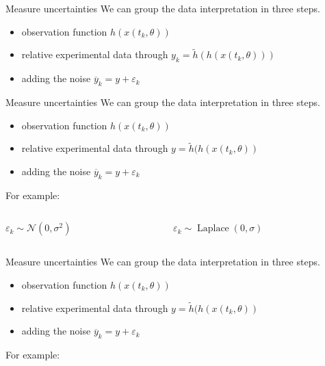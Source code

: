 \documentclass{beamer}
\newcommand{\s}{\sigma^2}
\begin{document}
  	\begin{frame}{Measure uncertainties}
    	We can group the data interpretation in three steps.
    	\begin{itemize}
    		\item observation function $h(x(t_k,\theta))$
    		\item relative experimental data through $y_k = \tilde{h}
    		(h(x(t_k,\theta)))$
    		\item adding the noise $\overline{y}_{k} = y + \varepsilon_{k}$
    	\end{itemize}
  	\end{frame}
  	
  	\begin{frame}{Measure uncertainties}
    	We can group the data interpretation in three steps.
    	\begin{itemize}
    		\item observation function $h(x(t_k,\theta))$
    		\item relative experimental data through $y = \tilde{h}
    		(h(x(t_k,\theta))$
    		\item adding the noise $\overline{y}_{k} = y + \varepsilon_{k}$
    	\end{itemize}
    	For example:
    	\vspace{0.7cm}
    	\begin{columns}
  			\begin{column}{3cm}
  				$\varepsilon_{k} \sim \mathcal{N}(0,\s)$
  			\end{column}
  			\begin{column}{4cm}
 				$\varepsilon_{k} \sim \operatorname{Laplace}(0,\sigma)$
  			\end{column}
  		\end{columns}
  	\end{frame}
  	
  	\begin{frame}{Measure uncertainties}
    	We can group the data interpretation in three steps.
    	\begin{itemize}
    		\item observation function $h(x(t_k,\theta))$
    		\item relative experimental data through $y = \tilde{h}
    		(h(x(t_k,\theta))$
    		\item adding the noise $\overline{y}_{k} = y + \varepsilon_{k}$
    	\end{itemize}
    	For example:
    	\vspace{0.7cm}
  		\tcbox[colframe=red!75!black]
  		{$\epsilon_{k} \sim \mathcal{N}(0,\s)$}
  	\end{frame}
  	
\end{document}
